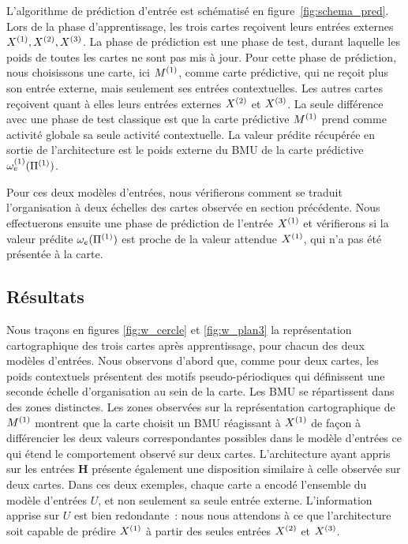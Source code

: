 \documentclass[../main]{subfiles}
\begin{document}
L'algorithme de prédiction d'entrée est schématisé en figure~\ref{fig:schema_pred}.
Lors de la phase d'apprentissage, les trois cartes reçoivent leurs entrées externes $X^{({1})},X^{({2})}, X^{({3})}$.
La phase de prédiction est une phase de test, durant laquelle les poids de toutes les cartes ne sont pas mis à jour.
Pour cette phase de prédiction, nous choisissons une carte, ici $M^{({1})}$, comme carte prédictive, qui ne reçoit plus son entrée externe, mais seulement ses entrées contextuelles.
Les autres cartes reçoivent quant à elles leurs entrées externes $X^{({2})}$ et $X^{({3})}$.
La seule différence avec une phase de test classique est que la carte prédictive $M^{({1})}$ prend comme activité globale sa seule activité contextuelle.
La valeur prédite récupérée en sortie de l'architecture est le poids externe du BMU de la carte prédictive $\omega_{e}^{({1})}(\Pi^{({1})})$.

Pour ces deux modèles d'entrées, nous vérifierons comment se traduit l'organisation à deux échelles des cartes observée en section précédente.
Nous effectuerons ensuite une phase de prédiction de l'entrée $X^{({1})}$ et vérifierons si la valeur prédite $\omega_{e}(\Pi^{({1})})$ est proche de la valeur attendue $X^{({1})}$, qui n'a pas été présentée à la carte.


\subsection{Résultats}

Nous traçons en figures \ref{fig:w_cercle} et \ref{fig:w_plan3} la représentation cartographique des trois cartes après apprentissage, pour chacun des deux modèles d'entrées.
Nous observons d'abord que, comme pour deux cartes, les poids contextuels présentent des motifs pseudo-périodiques qui définissent une seconde échelle d'organisation au sein de la carte.
Les BMU se répartissent dans des zones distinctes. 
Les zones observées sur la représentation cartographique de $M^{({1})}$ montrent que la carte choisit un BMU réagissant à $X^{({1})}$ de façon à différencier les deux valeurs correspondantes possibles dans le modèle d'entrées  ce qui étend le comportement observé sur deux cartes.
L'architecture ayant appris sur les entrées \textbf{H} présente également une disposition similaire à celle observée sur deux cartes.
Dans ces deux exemples, chaque carte a encodé l'ensemble du modèle d'entrées $U$, et non seulement sa seule entrée externe. L'information apprise sur $U$ est bien redondante~: nous nous attendons à ce que l'architecture soit capable de prédire $X^{({1})}$ à partir des seules entrées $X^{({2})}$ et $X^{({3})}$.
\end{document}
